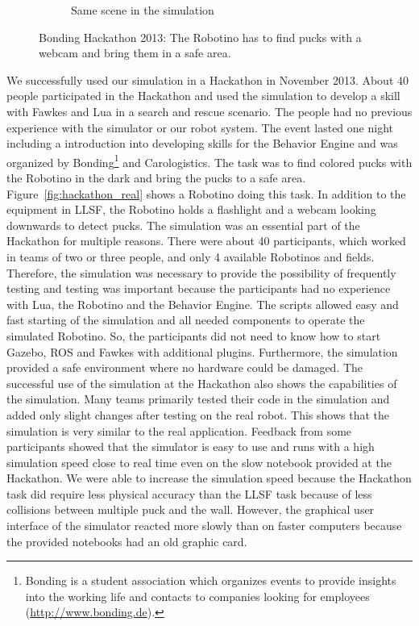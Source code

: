 \begin{figure}
\begin{subfigure}[b]{0.47\textwidth}
    \caption{Same scene in the simulation\\}
    \label{fig:hackathon_sim}
  \end{subfigure}
  \caption{Bonding Hackathon 2013: The Robotino has to find pucks with a webcam and bring them in a safe area.}
  \label{fig:hackathon}
\end{figure}
We successfully used our simulation in a Hackathon in November 2013. About 40 people participated in the Hackathon and used the simulation to develop a skill with Fawkes and Lua in a search and rescue scenario. The people had no previous experience with the simulator or our robot system. The event lasted one night including a introduction into developing skills for the Behavior Engine and was organized by Bonding\footnote{Bonding is a student association which organizes events to provide insights into the working life and contacts to companies looking for employees (\url{http://www.bonding.de}).} and Carologistics. The task was to find colored pucks with the Robotino in the dark and bring the pucks to a safe area. Figure~\ref{fig:hackathon_real} shows a Robotino doing this task. In addition to the equipment in LLSF, the Robotino holds a flashlight and a webcam looking downwards to detect pucks. The simulation was an essential part of the Hackathon for multiple reasons. There were about 40 participants, which worked in teams of two or three people, and only 4 available Robotinos and fields. Therefore, the simulation was necessary to provide the possibility of frequently testing and testing was important because the participants had no experience with Lua, the Robotino and the Behavior Engine. The scripts allowed easy and fast starting of the simulation and all needed components to operate the simulated Robotino. So, the participants did not need to know how to start Gazebo, ROS and Fawkes with additional plugins. Furthermore, the simulation provided a safe environment where no hardware could be damaged. The successful use of the simulation at the Hackathon also shows the capabilities of the simulation. Many teams primarily tested their code in the simulation and added only slight changes after testing on the real robot. This shows that the simulation is very similar to the real application. Feedback from some participants showed that the simulator is easy to use and runs with a high simulation speed close to real time even on the slow notebook provided at the Hackathon. We were able to increase the simulation speed because the Hackathon task did require less physical accuracy than the LLSF task because of less collisions between multiple puck and the wall. However, the graphical user interface of the simulator reacted more slowly than on faster computers because the provided notebooks had an old graphic card.\\
